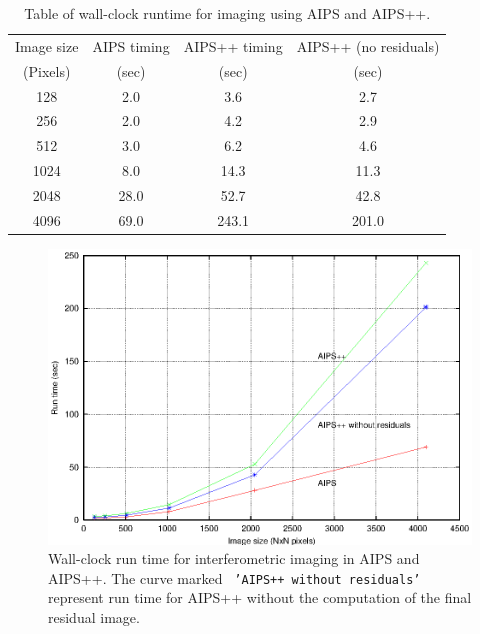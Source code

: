\begin{table}[h!]
\begin{center}
\caption{\small Table of wall-clock runtime for imaging using AIPS and AIPS++.}
\label{IMAGER_TAB}
\vskip 0.5cm
\begin{tabular}{|c|c|c|c|}
\hline
Image size & AIPS timing & AIPS++ timing & AIPS++ (no residuals)\\
(Pixels)   & (sec)        & (sec)          & (sec)\\
\hline
128        &    2.0       &  3.6          & 2.7\\
256        &    2.0       &  4.2          & 2.9\\
512        &    3.0       &  6.2          & 4.6\\
1024       &    8.0       & 14.3          & 11.3\\
2048       &    28.0      & 52.7          & 42.8\\
4096       &    69.0      & 243.1         & 201.0\\
\hline
\end{tabular}
\end{center}
\end{table}


\begin{figure}[th!]
\begin{center}
  \includegraphics{aips_aips2_I_withoutresidual.2.eps}
\caption[Imaging timing for AIPS and AIPS++]{\small Wall-clock run time for
interferometric imaging in AIPS and AIPS++.  The curve marked {\tt
'AIPS++ without residuals'} represent run time for AIPS++ without
the computation of the final residual image.}
\label{IMAGER_PLOT}
\end{center}
\end{figure}

